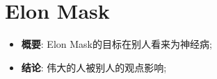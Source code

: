 \section{Elon Mask}

  \begin{itemize}
    \item \textbf{概要}: Elon Mask的目标在别人看来为神经病;
    \item \textbf{结论}: 伟大的人被别人的观点影响;
  \end{itemize}
